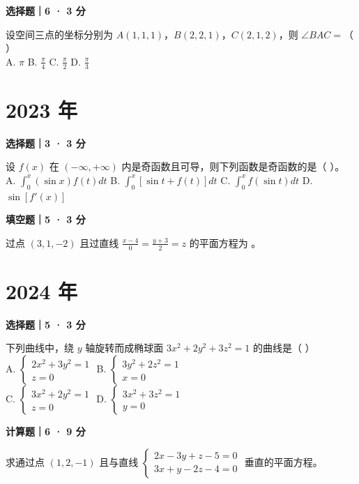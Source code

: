 \textbf{选择题｜6 · 3 分}

设空间三点的坐标分别为 $A(1, 1, 1)$，$B(2, 2, 1)$，$C(2, 1, 2)$，则 $\angle BAC =$（ \quad ）\\
A. $\pi$ \quad B. $\frac{\pi}{4}$ \quad C. $\frac{\pi}{2}$ \quad D. $\frac{\pi}{3}$


\section*{2023 年}


\textbf{选择题｜3 · 3 分}

设 $f(x)$ 在 $(-\infty, +\infty)$ 内是奇函数且可导，则下列函数是奇函数的是（ \quad ）。\\
A. $\int_0^x (\sin x)f(t) dt$ \quad B. $\int_0^x [\sin t + f(t)] dt$ \quad C. $\int_0^x f(\sin t) dt$ \quad D. $\sin[f'(x)]$


\textbf{填空题｜5 · 3 分}

过点 $(3, 1, -2)$ 且过直线 $\frac{x-4}{0} = \frac{y+3}{2} = z$ 的平面方程为 \underline{\hspace{3cm}}。


\section*{2024 年}


\textbf{选择题｜5 · 3 分}

下列曲线中，绕 $y$ 轴旋转而成椭球面 $3x^2 + 2y^2 + 3z^2 = 1$ 的曲线是（ \quad ）\\
A. $\begin{cases} 2x^2 + 3y^2 = 1 \\ z = 0 \end{cases}$ \quad B. $\begin{cases} 3y^2 + 2z^2 = 1 \\ x = 0 \end{cases}$\\
C. $\begin{cases} 3x^2 + 2y^2 = 1 \\ z = 0 \end{cases}$ \quad D. $\begin{cases} 3x^2 + 3z^2 = 1 \\ y = 0 \end{cases}$


\textbf{计算题｜6 · 9 分}

求通过点 $(1, 2, -1)$ 且与直线 $\begin{cases} 2x - 3y + z - 5 = 0 \\ 3x + y - 2z - 4 = 0 \end{cases}$ 垂直的平面方程。
